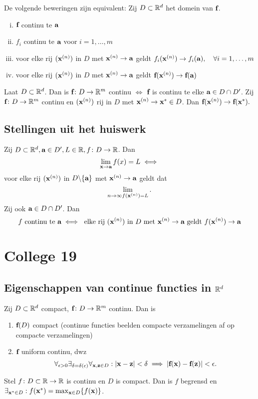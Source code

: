\documentclass{2wa40summary}
\begin{document}
	 De volgende beweringen zijn equivalent: Zij $D\subset\mathbb{R}^d$ het domein van ${\textbf{f}}$.
	\begin{enumerate}[(i)]
		\item ${\textbf{f}}$ continu te ${\textbf{a}}$
		\item $f_i$ continu te ${\textbf{a}}$ voor $i=1,\ldots,m$
		\item voor elke rij $({\textbf{x}}^{(n)})$ in $D$ met ${\textbf{x}}^{(n)}\to{\textbf{a}}$ geldt $f_i({\textbf{x}}^{(n)}) \to f_i({\textbf{a}}),\quad\forall i=1,\ldots,m$
		\item voor elke rij $({\textbf{x}}^{(n)})$ in $D$ met ${\textbf{x}}^{(n)}\to{\textbf{a}}$ geldt ${\textbf{f}}({\textbf{x}}^{(n)})\to{\textbf{f}}({\textbf{a}})$
	\end{enumerate}
	
	Laat $D \subset \mathbb{R}^d$. Dan is ${\textbf{f}}\colon D \to \mathbb{R}^m$ continu $\iff$ ${\textbf{f}}$ is continu te elke ${\textbf{a}}\in D\cap D'$.
	\opm Zij ${\textbf{f}}\colon D\to \mathbb{R}^m$ continu en $({\textbf{x}}^{(n)})$ rij in $D$ met ${\textbf{x}}^{(n)} \to {\textbf{x}}^* \in D$.
	Dan ${\textbf{f}}({\textbf{x}}^{(n)}) \to {\textbf{f}}({\textbf{x}}^*).$
	\subsection{Stellingen uit het huiswerk}
	\theorem Zij $D \subset \mathbb{R}^d, {\textbf{a}} \in D', L \in \mathbb{R}, f\colon D \to \mathbb{R}$. Dan
	\[
	\lim_{{\textbf{x}}\to{\textbf{a}}}f(x)=L \iff
	\]
	voor elke rij $({\textbf{x}}^{(n)})$ in $D\backslash\lbrace{\textbf{a}}\rbrace$ met ${\textbf{x}}^{(n)}\to{\textbf{a}}$ geldt dat
	\[
	\lim_{n\to\infty f({\textbf{x}}^{(n)}) = L}.
	\]
	Zij ook ${\textbf{a}} \in D \cap D'$. Dan
	\[f \text{ continu te } {\textbf{a}} \iff \text{ elke rij }({\textbf{x}}^{(n)}) \text{ in } D \text{ met } {\textbf{x}}^{(n)}\to{\textbf{a}} \text{ geldt } f({\textbf{x}}^{(n)}) \to{\textbf{a}}\]
	
	\newpage
	\section{College 19}
	\subsection{Eigenschappen van continue functies in $\mathbb{R}^d$}
	\begin{theorem}
		Zij $D \subset \mathbb{R}^d$ compact, ${\textbf{f}}\colon D\to\mathbb{R}^m$ continu. Dan is
		\begin{enumerate}[(1)]
			\item ${\textbf{f}}(D)$ compact (continue functies beelden compacte verzamelingen af op compacte verzamelingen)
			\item ${\textbf{f}}$ uniform continu, dwz
			\[\forall_{\epsilon > 0} \exists_{\delta = \delta(\epsilon)}\forall_{\x,\z\in D}:
			\abs{\x-\z}<\delta \implies |\f(\x)-\f(\z)|<\epsilon.
			\]
		\end{enumerate}
	\end{theorem}
	Stel $f\colon D\subset\mathbb{R}\to\mathbb{R}$ is continu
	en $D$ is compact. Dan is $f$ begrensd en $\exists_{{\textbf{x}}^* \in D}:f({\textbf{x}}^*)=\max_{{\textbf{x}}\in D}\lbrace f({\textbf{x}})\rbrace$.
	
\end{document}
